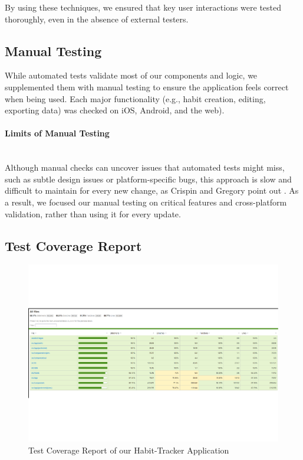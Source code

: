 By using these techniques, we ensured that key user interactions were tested thoroughly, even in the absence of external testers.


\subsection{Manual Testing}

While automated tests validate most of our components and logic, we supplemented them with manual testing to ensure the application feels correct when being used. Each major functionality (e.g., habit creation, editing, exporting data) was checked on iOS, Android, and the web).

\paragraph{Limits of Manual Testing}\mbox{}\\
Although manual checks can uncover issues that automated tests might miss, such as subtle design issues or platform-specific bugs, this approach is slow and difficult to maintain for every new change, as Crispin and Gregory point out \cite{crispin2009agiletesting}. As a result, we focused our manual testing on critical features and cross-platform validation, rather than using it for every update.

\subsection{Test Coverage Report} \label{sect:test-coverage} 
\begin{figure}[H]
    \centering
    \includegraphics[width=1.0\textwidth]{resources/test_coverage.pdf}
    \caption{Test Coverage Report of our Habit-Tracker Application}
    \label{fig:test_coverage}
\end{figure}

